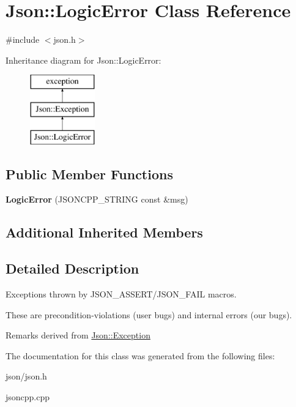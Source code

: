 \hypertarget{classJson_1_1LogicError}{}\section{Json\+:\+:Logic\+Error Class Reference}
\label{classJson_1_1LogicError}


{\ttfamily \#include $<$json.\+h$>$}

Inheritance diagram for Json\+:\+:Logic\+Error\+:\begin{figure}[H]
\begin{center}
\leavevmode
\includegraphics[height=3.000000cm]{classJson_1_1LogicError}
\end{center}
\end{figure}
\subsection*{Public Member Functions}
\begin{DoxyCompactItemize}
\item 
\mbox{\label{classJson_1_1LogicError_acca679aa49768a4a1de7b705c67c2919}} 
{\bfseries Logic\+Error} (J\+S\+O\+N\+C\+P\+P\+\_\+\+S\+T\+R\+I\+NG const \&msg)
\end{DoxyCompactItemize}
\subsection*{Additional Inherited Members}


\subsection{Detailed Description}
Exceptions thrown by J\+S\+O\+N\+\_\+\+A\+S\+S\+E\+R\+T/\+J\+S\+O\+N\+\_\+\+F\+A\+IL macros.

These are precondition-\/violations (user bugs) and internal errors (our bugs).

\begin{DoxyRemark}{Remarks}
derived from \hyperlink{classJson_1_1Exception}{Json\+::\+Exception} 
\end{DoxyRemark}


The documentation for this class was generated from the following files\+:\begin{DoxyCompactItemize}
\item 
json/json.\+h\item 
jsoncpp.\+cpp\end{DoxyCompactItemize}
